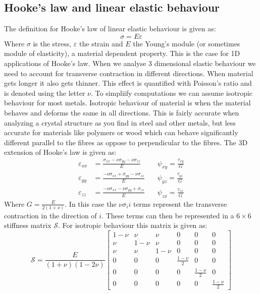 \documentclass[11pt, a4paper]{article}
\renewcommand*{\epsilon}{\varepsilon}
\numberwithin{equation}{section}
\numberwithin{figure}{section}
\begin{document}
\subsection{Hooke's law and linear elastic behaviour}
The definition for Hooke's law of linear elastic behaviour is given as:
\begin{equation}
  \sigma = E\epsilon
\end{equation}
Where $\sigma$ is the stress, $\epsilon$ the strain and $E$ the Young's module (or sometimes module of elasticity), a material dependent property. This is the case for 1D applications of Hooke's law. When we analyse 3 dimensional elastic behaviour we need to account for transverse contraction in different directions. When material gets longer it also gets thinner. This effect is quantified with Poisson's ratio and is denoted using the letter $\nu$. To simpliify computations we can assume isotropic behaviour for most metals. Isotropic behaviour of material is when the material behaves and deforms the same in all directions. This is fairly accurate when analyzing a crystal structure as you find in steel and other metals, but less accurate for materials like polymers or wood which can behave significantly different parallel to the fibres as oppose to perpendicular to the fibres. The 3D extension of Hooke's law is given as:
\begin{align}
  \epsilon_{xx} &= \frac{\sigma_{xx} - \nu\sigma_{yy} - \nu\sigma_{zz}}{E}\quad& \psi_{xy} = \frac{\tau_{xy}}{G}\\
  \epsilon_{yy} &= \frac{-\nu\sigma_{xx} + \sigma_{yy} - \nu\sigma_{zz}}{E}\quad& \psi_{yz} = \frac{\tau_{yz}}{G}\\
  \epsilon_{zz} &= \frac{-\nu\sigma_{xx} - \nu\sigma_{yy} + \sigma_{zz}}{E}\quad& \psi_{zx} = \frac{\tau_{zx}}{G}
\end{align}
Where $G = \frac{E}{2(1 + \nu)}$. In this case the $\nu\sigma_ii$ terms represent the transverse contraction in the direction of $i$. These terms can then be represented in a $6\times 6$ stiffness matrix $\mathcal{S}$. For isotropic behaviour this matrix is given as:
\begin{equation}
  \mathcal{S} = \frac{E}{(1+\nu)(1-2\nu)}
  \begin{bmatrix}
    1-\nu & \nu   & \nu   & 0               & 0                & 0\\
    \nu   & 1-\nu & \nu   & 0               & 0                & 0\\
    \nu   & \nu   & 1-\nu & 0               & 0                & 0\\
    0     & 0     & 0     & \frac{1-\nu}{2} & 0                & 0\\
    0     & 0     & 0     & 0               &  \frac{1-\nu}{2} & 0\\
    0     & 0     & 0     & 0               &  0               & \frac{1-\nu}{2}
  \end{bmatrix}
\end{equation}
\end{document}
